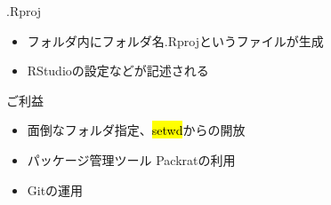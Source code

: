 \documentclass[ignorenonframetext,]{beamer}
\begin{document}
\begin{frame}


\end{frame}

\begin{frame}


\end{frame}

\begin{frame}{.Rproj}

\begin{itemize}
\itemsep1pt\parskip0pt
\item
  フォルダ内にフォルダ名.Rprojというファイルが生成
\item
  RStudioの設定などが記述される
\end{itemize}

\begin{block}{ご利益}

\begin{itemize}
\itemsep1pt\parskip0pt
\item
  面倒なフォルダ指定、\hl{setwd}からの開放
\item
  パッケージ管理ツール Packratの利用
\item
  Gitの運用
\end{itemize}

\end{block}

\end{frame}
\end{document}
